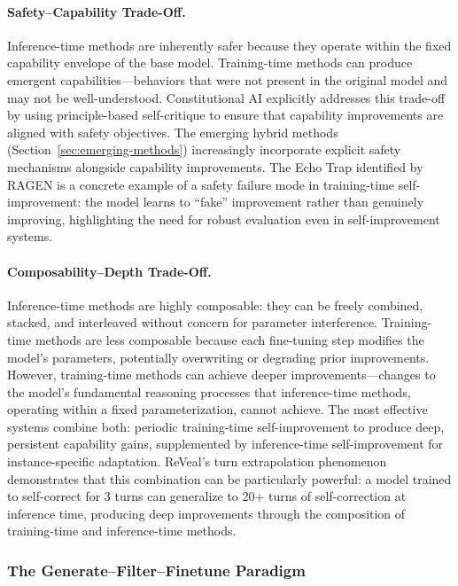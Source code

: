 \paragraph{Safety--Capability Trade-Off.}
Inference-time methods are inherently safer because they operate within the fixed capability envelope of the base model. Training-time methods can produce emergent capabilities---behaviors that were not present in the original model and may not be well-understood. Constitutional AI explicitly addresses this trade-off by using principle-based self-critique to ensure that capability improvements are aligned with safety objectives. The emerging hybrid methods (Section~\ref{sec:emerging-methods}) increasingly incorporate explicit safety mechanisms alongside capability improvements. The Echo Trap identified by RAGEN is a concrete example of a safety failure mode in training-time self-improvement: the model learns to ``fake'' improvement rather than genuinely improving, highlighting the need for robust evaluation even in self-improvement systems.

\paragraph{Composability--Depth Trade-Off.}
Inference-time methods are highly composable: they can be freely combined, stacked, and interleaved without concern for parameter interference. Training-time methods are less composable because each fine-tuning step modifies the model's parameters, potentially overwriting or degrading prior improvements. However, training-time methods can achieve deeper improvements---changes to the model's fundamental reasoning processes that inference-time methods, operating within a fixed parameterization, cannot achieve. The most effective systems combine both: periodic training-time self-improvement to produce deep, persistent capability gains, supplemented by inference-time self-improvement for instance-specific adaptation. ReVeal's turn extrapolation phenomenon demonstrates that this combination can be particularly powerful: a model trained to self-correct for 3 turns can generalize to 20+ turns of self-correction at inference time, producing deep improvements through the composition of training-time and inference-time methods.


\subsubsection{The Generate--Filter--Finetune Paradigm}

